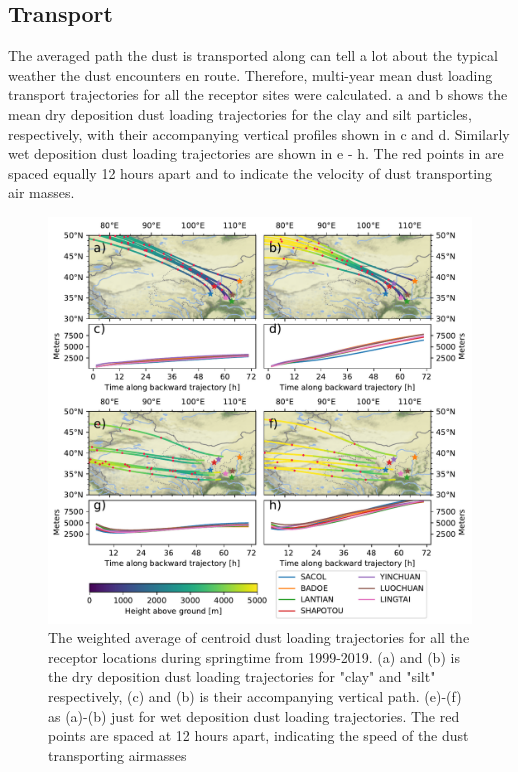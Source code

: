 \subsection{Transport}
The averaged path the dust is transported along can tell a lot about the typical weather the dust encounters en route.    
Therefore, multi-year mean dust loading transport trajectories for all the receptor sites were calculated.
a and b shows the mean dry deposition dust loading trajectories for the clay and silt particles, respectively, with their accompanying vertical profiles shown in c and d. Similarly wet deposition dust loading trajectories are shown in e - h. 
The red points in  are spaced equally 12 hours apart and to indicate the velocity of dust transporting air masses. 
\begin{figure}[hptb]
    \centering
    \includegraphics[width=\textwidth]{texfiles/figs/average_dust_transport_trajectories.pdf}
    \caption{The weighted average of centroid dust loading trajectories for all the receptor locations during springtime from 1999-2019. (a) and (b) is the dry deposition dust loading trajectories for "clay" and "silt" respectively, (c) and (b) is their accompanying vertical path.  (e)-(f) as (a)-(b) just for wet deposition dust loading trajectories. The red points are spaced at 12 hours apart, indicating the speed of the dust transporting airmasses }
    \label{fig:dust_loading_trajecs}
\end{figure}

